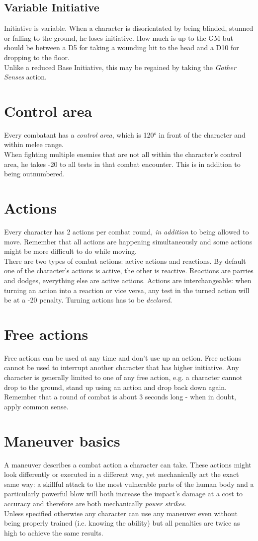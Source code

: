 \subsection{Variable Initiative}
\label{subsec:variableini}
Initiative is variable. When a character is disorientated by being blinded, stunned or falling to the ground, he loses initiative. How much is up to the GM but should be between a D5 for taking a wounding hit to the head and a D10 for dropping to the floor.
\\%
Unlike a reduced Base Initiative, this may be regained by taking the \emph{Gather Senses} action.
\section{Control area}
Every combatant has a \emph{control area}, which is 120° in front of the character and within melee range. \\
When fighting multiple enemies that are not all within the character's control area, he takes -20 to all tests in that combat encounter. This is in addition to being outnumbered.
\section{Actions}
Every character has 2 actions per combat round, \emph{in addition} to being allowed to move. Remember that all actions are happening simultaneously and some actions might be more difficult to do while moving.\\
There are two types of combat actions: active actions and reactions. By default one of the character’s actions is active, the other is reactive. Reactions are parries and dodges, everything else are active actions. Actions are interchangeable: when turning an action into a reaction or vice versa, any test in the turned action will be at a -20 penalty. Turning actions has to be \emph{declared}.
\section{Free actions}
Free actions can be used at any time and don't use up an action. Free actions cannot be used to interrupt another character that has higher initiative. Any character is generally limited to one of any free action, e.g. a character cannot drop to the ground, stand up using an action and drop back down again. Remember that a round of combat is about 3 seconds long - when in doubt, apply common sense.
\section{Maneuver basics}
A maneuver describes a combat action a character can take. These actions might look differently or executed in a different way, yet mechanically act the exact same way: a skillful attack to the most vulnerable parts of the human body and a particularly powerful blow will both increase the impact’s damage at a cost to accuracy and therefore are both mechanically \textit{power strikes}.\\
Unless specified otherwise any character can use any maneuver even without being properly trained (i.e. knowing the ability) but all penalties are twice as high to achieve the same results.
